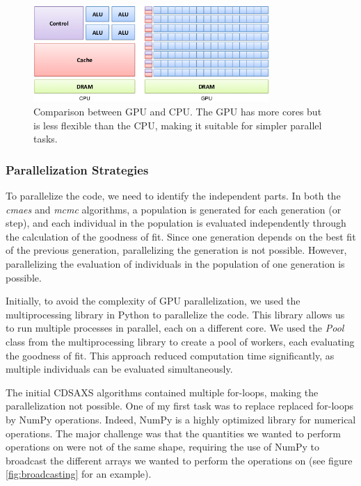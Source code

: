 \medskip

\begin{figure}[h]
    \centering
    \includegraphics[width=0.8\textwidth]{images/gpu_vs_cpu.png}
    \caption{Comparison between GPU and CPU. The GPU has more cores but is less flexible than the CPU, making it suitable for simpler parallel tasks. \cite{gpu_vs_cpu}}
\end{figure}

\subsubsection{Parallelization Strategies}

To parallelize the code, we need to identify the independent parts. In both the \textit{cmaes} and \textit{mcmc} algorithms, a population is generated 
for each generation (or step), and each individual in the population is evaluated independently through the calculation of the goodness of fit. Since one generation 
depends on the best fit of the previous generation, parallelizing the generation is not possible. However, parallelizing the evaluation of individuals 
in the population of one generation is possible.

\medskip

Initially, to avoid the complexity of GPU parallelization, we used the multiprocessing library in Python to parallelize the code. This library allows 
us to run multiple processes in parallel, each on a different core. We used the \textit{Pool} class from the multiprocessing library to create a pool 
of workers, each evaluating the goodness of fit. This approach reduced computation time significantly, as multiple individuals can be evaluated simultaneously.

\medskip

The initial CDSAXS algorithms contained multiple for-loops, making the parallelization not possible. One of my first task was to replace
replaced for-loops by NumPy operations. Indeed, NumPy is a highly optimized library for numerical operations.
The major challenge was that the quantities we wanted to perform operations on were not of the same shape, requiring the use of NumPy to broadcast the different arrays
we wanted to perform the operations on (see figure \ref{fig:broadcasting} for an example).

